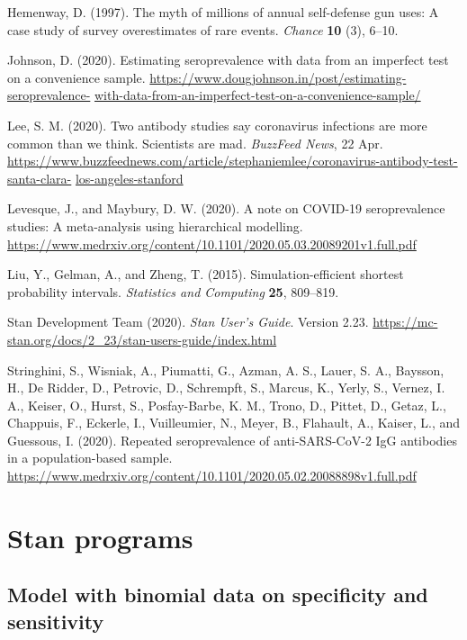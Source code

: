 \documentclass[11pt]{article}
\begin{document}
\bibitem Hemenway, D. (1997).  The myth of millions of annual
  self-defense gun uses: A case study of survey overestimates of rare
  events.  {\em Chance} {\bf 10} (3), 6--10.

\bibitem Johnson, D. (2020).  Estimating seroprevalence with data from
  an imperfect test on a convenience sample.  {\small
    \url{https://www.dougjohnson.in/post/estimating-seroprevalence-}} {\small \url{with-data-from-an-imperfect-test-on-a-convenience-sample/}}

\bibitem Lee, S. M. (2020).  Two antibody studies say coronavirus
  infections are more common than we think. Scientists are mad.  {\em
    BuzzFeed News}, 22 Apr.  {\small \url{https://www.buzzfeednews.com/article/stephaniemlee/coronavirus-antibody-test-santa-clara-}} {\small \url{los-angeles-stanford}}

\bibitem Levesque, J., and Maybury, D. W. (2020).  A note on COVID-19
  seroprevalence studies: A meta-analysis using hierarchical
  modelling.  {\small
    \url{https://www.medrxiv.org/content/10.1101/2020.05.03.20089201v1.full.pdf}}

\bibitem Liu, Y., Gelman, A., and Zheng, T. (2015).
  Simulation-efficient shortest probability intervals. {\em Statistics
    and Computing} {\bf 25}, 809--819.

\bibitem Stan Development Team (2020). {\em Stan User's Guide}. Version
  2.23. {\small \url{https://mc-stan.org/docs/2_23/stan-users-guide/index.html}}

\bibitem Stringhini, S., Wisniak, A., Piumatti, G., Azman, A. S.,
  Lauer, S. A., Baysson, H., De Ridder, D., Petrovic, D., Schrempft,
  S., Marcus, K., Yerly, S., Vernez, I. A., Keiser, O., Hurst, S.,
  Posfay-Barbe, K. M., Trono, D., Pittet, D., Getaz, L., Chappuis, F.,
  Eckerle, I., Vuilleumier, N., Meyer, B., Flahault, A., Kaiser, L.,
  and Guessous, I. (2020).  Repeated seroprevalence of anti-SARS-CoV-2
  IgG antibodies in a population-based sample.  {\small
    \url{https://www.medrxiv.org/content/10.1101/2020.05.02.20088898v1.full.pdf}}

\pagebreak
\appendix

\section{Stan programs}

\subsection{Model with binomial data on specificity and sensitivity}\label{stan2}
\end{document}
